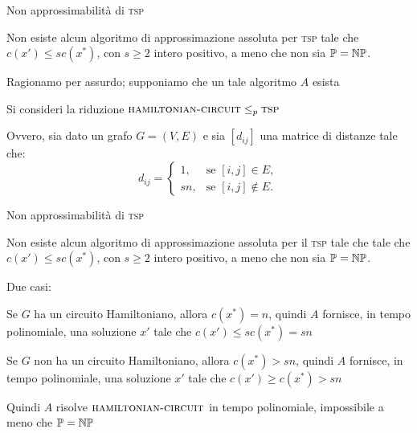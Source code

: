 \begin{frame}{Non approssimabilità di \textsc{tsp}}

\vspace{-9pt}
\begin{myboxtitle}[Teorema]
Non esiste alcun algoritmo di approssimazione assoluta per 
\textsc{tsp} tale che $c(x') \le sc(x^*)$, con $s \geq 2$ intero positivo, a meno che non sia $\mathbb{P} = \mbox{$\mathbb{NP}$}$.
\end{myboxtitle}

\medskip
{}
\BIL
\item Ragionamo per assurdo; supponiamo che un tale algoritmo $A$ esista
\item Si consideri la riduzione $\textsc{hamiltonian-circuit} \leq_p \textsc{tsp}$
\item Ovvero, sia dato un grafo $G=(V,E)$ e sia $[d_{ij}]$ una
matrice di distanze tale che:
\[
d_{ij} = \begin{cases}
1, &\textrm{se $[i, j] \in E$},\\
sn, &\textrm{se $[i, j] \notin E$}.
\end{cases}
\]
\EIL

\end{frame}

\begin{frame}{Non approssimabilità di \textsc{tsp}}

\vspace{-9pt}
\begin{myboxtitle}[Teorema]
Non esiste alcun algoritmo di approssimazione assoluta per il
\textsc{tsp} tale che 
 tale che $c(x') \le sc(x^*)$, con $s \geq 2$ intero positivo, a meno che non sia $\mathbb{P} = \mbox{$\mathbb{NP}$}$.
\end{myboxtitle}

\medskip
{}
\BIL
\item Due casi:
  \BI
  \item Se $G$ ha un circuito Hamiltoniano, allora $c(x^*) = n$, quindi $A$ fornisce, in tempo polinomiale, una soluzione $x'$ tale che $c(x') \le sc(x^*) = sn$
  \item Se $G$ non ha un circuito Hamiltoniano, allora $c(x^*) > sn$, quindi
  $A$ fornisce, in tempo polinomiale, una soluzione $x'$ tale che $c(x') \geq c(x^*) > sn$
  \EI
\item Quindi $A$ risolve $\textsc{hamiltonian-circuit}$ in tempo polinomiale,
impossibile a meno che $\mathbb{P} = \mbox{$\mathbb{NP}$}$
\EIL

\end{frame}

